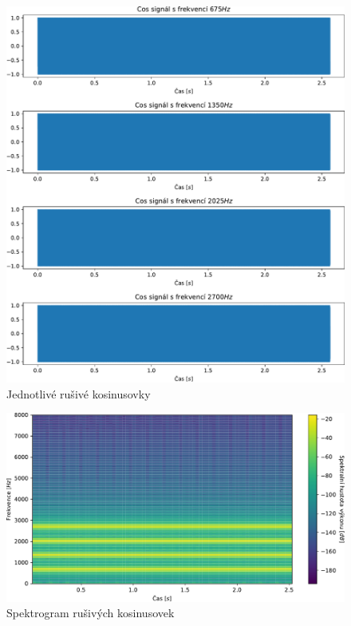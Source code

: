\documentclass[a4paper, 11pt, final]{article}
\begin{document}
\begin{figure}[ht]
    \centering
    \includegraphics[scale=0.5]{img/06-cos-signals-divided.pdf}
    \caption{Jednotlivé rušivé kosinusovky}
    \label{fig:cos-signals-divided}
\end{figure}

\begin{figure}[ht]
    \centering
    \includegraphics[width=\textwidth]{img/06-cos-signals-spectrum.pdf}
    \caption{Spektrogram rušivých kosinusovek}
    \label{fig:cos-signals-spectrogram}
\end{figure}
\end{document}

